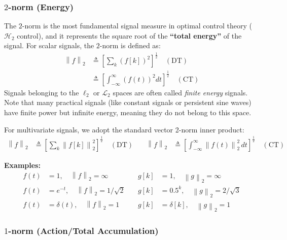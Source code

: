 \documentclass[11pt, a4paper, twoside]{article}
\newcommand{\norm}[1]{\left\lVert#1\right\rVert}
\theoremstyle{plain}
\theoremstyle{definition}
\begin{document}
\subsubsection*{$2$-norm (Energy)}

The $2$-norm is the most fundamental signal measure in optimal control theory ($\mathcal{H}_2$ control), and it represents the square root of the \textbf{``total energy''} of the signal. For scalar signals, the $2$-norm is defined as:
%
\begin{align*}
	\norm{f}_{2} &\triangleq \left[ \sum_{k} (f[k])^2 \right]^{\frac{1}{2}} \quad (\mathrm{DT})
	\\
	&\triangleq \left[ \int_{-\infty}^{\infty} (f(t))^2 dt \right]^{\frac{1}{2}}  \quad (\mathrm{CT})
\end{align*}
%
Signals belonging to the $\ell_{2}$ or $\mathcal{L}_{2}$ spaces are often called \textit{finite energy} signals. Note that many practical signals (like constant signals or persistent sine waves) have finite power but infinite energy, meaning they do not belong to this space.

For multivariate signals, we adopt the standard vector 2-norm inner product:
%
\begin{align*}
	\norm{f}_{2} &\triangleq \left[ \sum_{k} \norm{f[k]}_2^2 \right]^{\frac{1}{2}} 
	\quad (\mathrm{DT}) \quad & \norm{f}_{2} &\triangleq \left[ \int_{-\infty}^{\infty} \norm{f(t)}_2^2 \, dt \right]^{\frac{1}{2}} 
	\quad (\mathrm{CT})
\end{align*}

\textbf{Examples:}
%
\begin{align*}
	f(t) &= 1 , \quad \norm{f}_{2} = \infty  &\quad g[k] &= 1 , \quad \norm{g}_{2} = \infty \\
	f(t) &= e^{-t} , \quad \norm{f}_{2} = 1/\sqrt{2} &\quad g[k] &= 0.5^k , \quad \norm{g}_{2} = 2/\sqrt{3} \\
	f(t) &= \delta(t) , \quad \norm{f}_{2} = 1 &\quad g[k] &= \delta[k] , \quad \norm{g}_{2} = 1
\end{align*}

\subsubsection*{$1$-norm (Action/Total Accumulation)}
\end{document}
